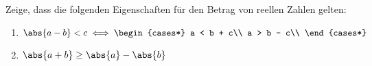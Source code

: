 \begin{exercise}
 Zeige, dass die folgenden Eigenschaften für den Betrag von reellen Zahlen
 gelten:
 \begin{enumerate}
 \item
   \(\displaystyle
     \abs{a - b} < c
     \iff
     \begin{cases*}
       a < b + c\\
       a > b - c\\
     \end{cases*}
   \)
   \item $\abs{a + b} \geq \abs{a} - \abs{b}$
 \end{enumerate}
\end{exercise}
